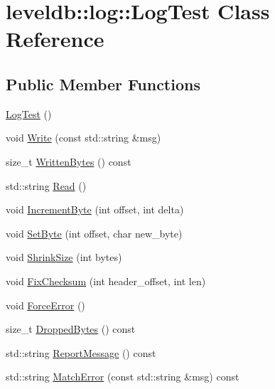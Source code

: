 \hypertarget{classleveldb_1_1log_1_1_log_test}{}\section{leveldb\+:\+:log\+:\+:Log\+Test Class Reference}
\label{classleveldb_1_1log_1_1_log_test}
\subsection*{Public Member Functions}
\begin{DoxyCompactItemize}
\item 
\hyperlink{classleveldb_1_1log_1_1_log_test_a71c5f0a5a098ca82a72e7065141a1d06}{Log\+Test} ()
\item 
void \hyperlink{classleveldb_1_1log_1_1_log_test_ab8af1c9335e7fbb42e06a6c01de2d0fc}{Write} (const std\+::string \&msg)
\item 
size\+\_\+t \hyperlink{classleveldb_1_1log_1_1_log_test_ad14bacbd6c103ac692bbb019ce9071a3}{Written\+Bytes} () const 
\item 
std\+::string \hyperlink{classleveldb_1_1log_1_1_log_test_a2f5deb8b04200600ac0bc7cd3e39bd57}{Read} ()
\item 
void \hyperlink{classleveldb_1_1log_1_1_log_test_aee52d93f17cf3e23b2ae11bd9a5f5652}{Increment\+Byte} (int offset, int delta)
\item 
void \hyperlink{classleveldb_1_1log_1_1_log_test_a2f3545c3cd495bb60b4322fa045b897c}{Set\+Byte} (int offset, char new\+\_\+byte)
\item 
void \hyperlink{classleveldb_1_1log_1_1_log_test_a2f19ddba7e239badc63920c6fb496823}{Shrink\+Size} (int bytes)
\item 
void \hyperlink{classleveldb_1_1log_1_1_log_test_ac966525faded349590f1a1ae738844cf}{Fix\+Checksum} (int header\+\_\+offset, int len)
\item 
void \hyperlink{classleveldb_1_1log_1_1_log_test_a817eeeba2beef1d81dac83badb9f1049}{Force\+Error} ()
\item 
size\+\_\+t \hyperlink{classleveldb_1_1log_1_1_log_test_afe6bc4454267707f11cd0441aeca3faf}{Dropped\+Bytes} () const 
\item 
std\+::string \hyperlink{classleveldb_1_1log_1_1_log_test_af7c61c3c2dfb9ac02a1e7b9f541fba6a}{Report\+Message} () const 
\item 
std\+::string \hyperlink{classleveldb_1_1log_1_1_log_test_a7f03fc33e830faea8090dd1aac148219}{Match\+Error} (const std\+::string \&msg) const 

\end{DoxyCompactItemize}
